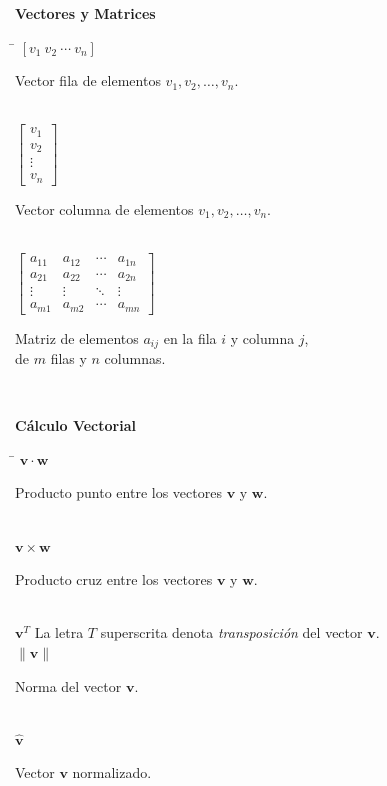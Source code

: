 \documentclass[11pt,letterpaper,twoside]{report}%
\begin{document}
{\bf Vectores y Matrices}
\begin{tabbing}
\hspace{\hdiml} \= \hspace{\hdim} \kill
$[v_1\ v_2\ \cdots\ v_n]$ \> \parbox[t]{\hdim}{Vector fila de elementos $v_1, v_2,\ldots, v_n$.}\\[\lsk]
$\left [
\begin{array}{c}v_1\\ v_2\\ \vdots\\ v_n\end{array}
\right ]$ \> \parbox[t]{\hdim}{Vector columna de elementos $v_1, v_2,\ldots, v_n$.}\\[\lsk]
$\left [
\begin{array}{cccc}
a_{11}&a_{12}&\cdots&a_{1n}\\ 
a_{21}&a_{22}&\cdots&a_{2n}\\
\vdots&\vdots&\ddots&\vdots\\
a_{m1}&a_{m2}&\cdots&a_{mn}
\end{array}
\right ]$
 \> \parbox[t]{\hdim}{\vspace*{-\baselineskip}\hspace*{3em} Matriz de elementos $a_{ij}$ en la fila $i$ y columna $j$,\\ 
                      \hspace*{3em} de $m$ filas y $n$ columnas.}\\[\lsk]
\end{tabbing}

{\bf Cálculo Vectorial}
\begin{tabbing}
\hspace{\hdiml} \= \hspace{\hdim} \kill
$\mathbf{v}\cdot \mathbf{w}$ \> \parbox[t]{\hdim}{Producto punto entre los vectores $\mathbf{v}$ y $\mathbf{w}$.}\\[\lsk]
$\mathbf{v}\times \mathbf{w}$ \> \parbox[t]{\hdim}{Producto cruz entre los vectores $\mathbf{v}$ y $\mathbf{w}$.}\\[\lsk]
$\mathbf{v}^T$         \> La letra $T$ superscrita denota {\em transposición} del vector $\mathbf{v}$.\\[\lsk]
$\|\mathbf{v}\|$ \> \parbox[t]{\hdim}{Norma del vector $\mathbf{v}$.}\\[\lsk]
$\hat{\mathbf{v}}$ \> \parbox[t]{\hdim}{Vector $\mathbf{v}$ normalizado.}\\[\lsk]
\end{tabbing}
\end{document}
